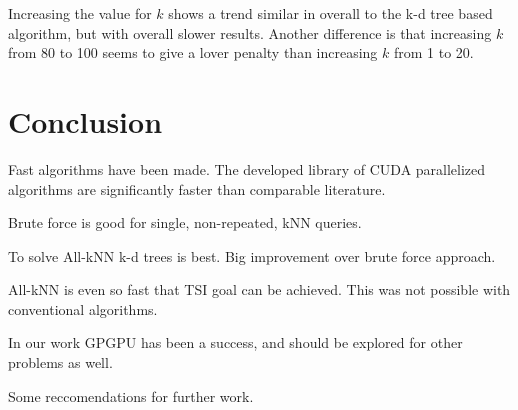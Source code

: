Increasing the value for $k$ shows a trend similar in overall to the k-d tree based algorithm, but with overall slower results. Another difference is that increasing $k$ from 80 to 100 seems to give a lover penalty than increasing $k$ from 1 to 20.

\section{Conclusion} %
\label{sec:conclusion}

Fast algorithms have been made. The developed library of CUDA parallelized algorithms are significantly faster than comparable literature.

Brute force is good for single, non-repeated, kNN queries.

To solve All-kNN k-d trees is best. Big improvement over brute force approach.

All-kNN is even so fast that TSI goal can be achieved. This was not possible with conventional algorithms. 

In our work GPGPU has been a success, and should be explored for other problems as well.

Some reccomendations for further work.
